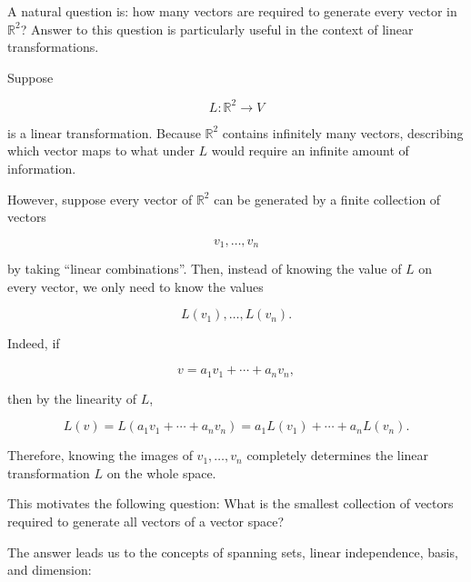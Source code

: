 A natural question is: how many vectors are required to generate every vector in
\(\mathbb{R}^2\)? Answer to this question is particularly useful in the context
of linear transformations.

Suppose

\[
	L:\mathbb{R}^2\rightarrow V
\]

is a linear transformation. Because \(\mathbb{R}^2\) contains infinitely many
vectors, describing which vector maps to what under \(L\) would require an
infinite amount of information.

However, suppose every vector of \(\mathbb{R}^2\) can be generated by a finite
collection of vectors

\begin{equation}
	v_1,\ldots,v_n
	\label{eq:basis-and-dimension-of-r-2}
\end{equation}

by taking ``linear combinations''. Then, instead of knowing the value of \(L\) on
every vector, we only need to know the values

\begin{equation}
	L(v_1),\ldots,L(v_n).
	\label{eq:basis-and-dimension-of-r-3}
\end{equation}

Indeed, if

\begin{equation}
	v=a_1v_1+\cdots+a_nv_n,
	\label{eq:basis-and-dimension-of-r-4}
\end{equation}

then by the linearity of \(L\),

\begin{equation}
	L(v)
	=
	L(a_1v_1+\cdots+a_nv_n)
	=
	a_1L(v_1)+\cdots+a_nL(v_n).
	\label{eq:basis-and-dimension-of-r-5}
\end{equation}

Therefore, knowing the images of \(v_1,\ldots,v_n\) completely determines the
linear transformation \(L\) on the whole space.

This motivates the following question: What is the smallest collection of vectors required to generate all vectors of a vector space?

The answer leads us to the concepts of spanning sets, linear independence, basis, and dimension:

